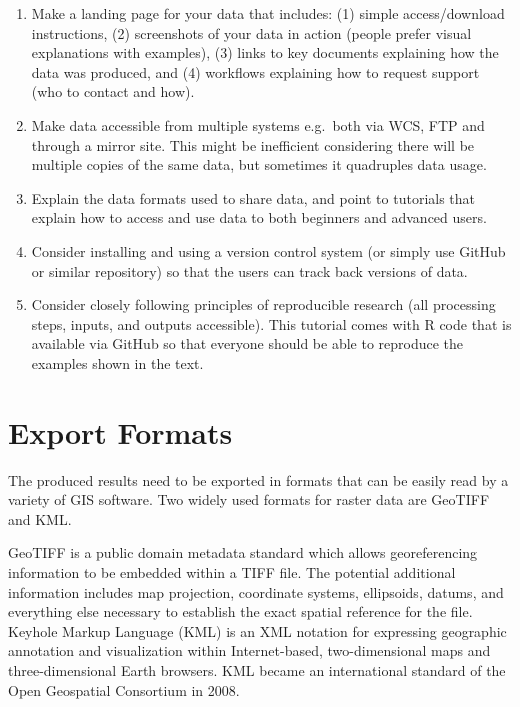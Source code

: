 \documentclass[10pt,b5paper,]{book}
\providecommand{\tightlist}{%
  \setlength{\itemsep}{0pt}\setlength{\parskip}{0pt}}
\theoremstyle{definition}
\theoremstyle{definition}
\theoremstyle{definition}
\theoremstyle{remark}
\begin{document}
\begin{enumerate}
\def\labelenumi{\arabic{enumi}.}
\tightlist
\item
  Make a landing page for your data that includes: (1) simple
  access/download instructions, (2) screenshots of your data in action
  (people prefer visual explanations with examples), (3) links to key
  documents explaining how the data was produced, and (4) workflows
  explaining how to request support (who to contact and how).
\item
  Make data accessible from multiple systems e.g.~both via WCS, FTP and
  through a mirror site. This might be inefficient considering there
  will be multiple copies of the same data, but sometimes it quadruples
  data usage.
\item
  Explain the data formats used to share data, and point to tutorials
  that explain how to access and use data to both beginners and advanced
  users.
\item
  Consider installing and using a version control system (or simply use
  GitHub or similar repository) so that the users can track back
  versions of data.
\item
  Consider closely following principles of reproducible research (all
  processing steps, inputs, and outputs accessible). This tutorial comes
  with R code that is available via GitHub so that everyone should be
  able to reproduce the examples shown in the text.
\end{enumerate}

\hypertarget{export-formats-1}{%
\section{Export Formats}\label{export-formats-1}}

The produced results need to be exported in formats that can be easily
read by a variety of GIS software. Two widely used formats for raster
data are GeoTIFF and KML.

GeoTIFF is a public domain metadata standard which allows georeferencing
information to be embedded within a TIFF file. The potential additional
information includes map projection, coordinate systems, ellipsoids,
datums, and everything else necessary to establish the exact spatial
reference for the file. Keyhole Markup Language (KML) is an XML notation
for expressing geographic annotation and visualization within
Internet-based, two-dimensional maps and three-dimensional Earth
browsers. KML became an international standard of the Open Geospatial
Consortium in 2008.
\end{document}
